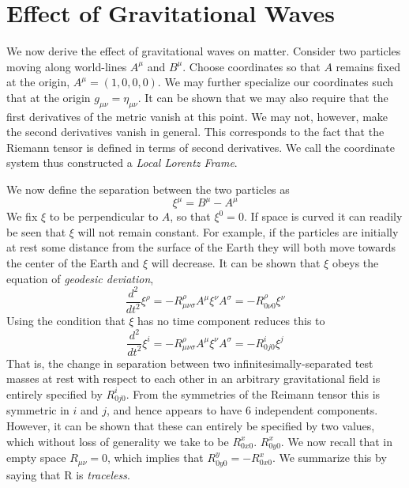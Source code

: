 \section{Effect of Gravitational Waves}
\label{sec:effects_of_waves}

We now derive the effect of gravitational waves on matter.  Consider
two particles moving along world-lines $A^\mu$ and $B^\mu$.  Choose
coordinates so that $A$ remains fixed at the origin, $A^\mu =
(1,0,0,0)$.  We may further specialize our coordinates such that at
the origin $g_{\mu\nu} = \eta_{\mu\nu}$.  It can be shown that we may
also require that the first derivatives of the metric vanish at this
point.  We may not, however, make the second derivatives vanish in
general.  This corresponds to the fact that the Riemann tensor is
defined in terms of second derivatives.  We call the coordinate system
thus constructed a \emph{Local Lorentz Frame}.

We now define the separation between the two particles as 
%
\begin{equation*}
\xi^\mu = B^\mu - A^\mu
\end{equation*}
%
We fix $\xi$ to be perpendicular to $A$, so that $\xi^0 = 0$.  If space
is curved it can readily be seen that $\xi$ will not remain constant.
For example, if the particles are initially at rest some distance from
the surface of the Earth they will both move towards the center of the
Earth and $\xi$ will decrease.  It can be shown that $\xi$ obeys the
equation of \emph{geodesic deviation},
%
\begin{equation}
\label{eq:geodesic_deviation}
\frac{d^2}{dt^2} \xi^\rho = -R^\rho_{\mu\nu\sigma} A^\mu \xi^\nu A^\sigma
=-R^\rho_{0 \nu 0} \xi^\nu 
\end{equation}
%
Using the condition that $\xi$ has no time component reduces this to 
%
\begin{equation}
\frac{d^2}{dt^2} \xi^i = -R^\rho_{\mu\nu\sigma} A^\mu \xi^\nu A^\sigma
=-R^i_{0 j 0} \xi^j
\end{equation}
%
That is, the change in separation between two
infinitesimally-separated test masses at rest with respect to each
other in an arbitrary gravitational field is entirely specified by
$R^i_{0 j 0}$.  From the symmetries of the Reimann tensor this is
symmetric in $i$ and $j$, and hence appears to have 6 independent
components.  However, it can be shown that these can entirely be
specified by two values, which without loss of generality we take to
be $R^x_{0 x 0}$.  $R^x_{0 y 0}$.  We now recall that in empty space
$R_{\mu\nu} = 0$, which implies that $R^y_{0 y 0} = - R^x_{0 x 0}$.
We summarize this by saying that R is \emph{traceless}.  

